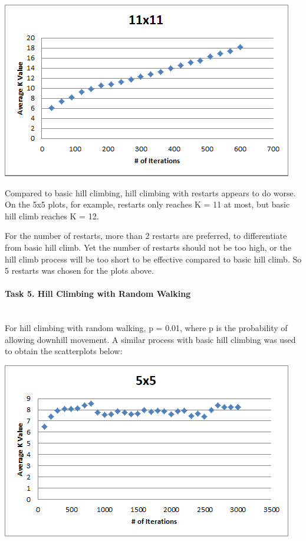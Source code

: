 \documentclass[12pt, letterpaper]{article}
\begin{document}
\bigskip

\includegraphics[width=\linewidth]{"Task 4/11x11 Scatterplot"}

\bigskip

Compared to basic hill climbing, hill climbing with restarts appears to do worse. On the 5x5 plots, for example, restarts only reaches K = 11 at most, but basic hill climb reaches K = 12.

For the number of restarts, more than 2 restarts are preferred, to differentiate from basic hill climb. Yet the number of restarts should not be too high, or the hill climb process will be too short to be effective compared to basic hill climb. So 5 restarts was chosen for the plots above.

\pagebreak
\paragraph{Task 5. Hill Climbing with Random Walking} \mbox{}\\

For hill climbing with random walking, p = 0.01, where p is the probability of allowing downhill movement. A similar process with basic hill climbing was used to obtain the scatterplots below:

\includegraphics[width=\linewidth]{"Task 5/5x5 Scatterplot"}
\end{document}
